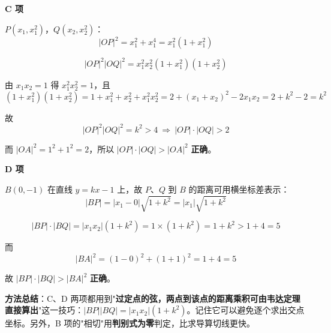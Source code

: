 \begin{answer}
\textbf{C 项 }

$P\left(x_1,x_1^{2}\right)$，$Q\left(x_2,x_2^{2}\right)$：
\nopagebreak[4]
\[|OP|^{2}=x_1^{2}+x_1^{4}=x_1^{2}\left(1+x_1^{2}\right)\]

\nopagebreak[4]
\[|OP|^{2}|OQ|^{2}=x_1^{2}x_2^{2}\left(1+x_1^{2}\right)\left(1+x_2^{2}\right)\]

由 $x_1x_2=1$ 得 $x_1^{2}x_2^{2}=1$，且
\nopagebreak[4]
\[\left(1+x_1^{2}\right)\left(1+x_2^{2}\right)=1+x_1^{2}+x_2^{2}+x_1^{2}x_2^{2}=2+\left(x_1+x_2\right)^{2}-2x_1x_2=2+k^{2}-2=k^{2}\]

故
\nopagebreak[4]
\[|OP|^{2}|OQ|^{2}=k^{2}>4\ \Longrightarrow\ |OP|\cdot|OQ|>2\]

而 $|OA|^{2}=1^{2}+1^{2}=2$，所以 $|OP|\cdot|OQ|>|OA|^{2}$  \textbf{正确}。

\par\medskip

\textbf{D 项 }

$B(0,-1)$ 在直线 $y=kx-1$ 上，故 $P$、$Q$ 到 $B$ 的距离可用横坐标差表示：
\nopagebreak[4]
\[|BP|=\left|x_1-0\right|\sqrt{1+k^{2}}=\left|x_1\right|\sqrt{1+k^{2}}\]

\nopagebreak[4]
\[|BP|\cdot|BQ|=\left|x_1x_2\right|\left(1+k^{2}\right)=1\times\left(1+k^{2}\right)=1+k^{2}>1+4=5\]

而
\nopagebreak[4]
\[|BA|^{2}=(1-0)^{2}+(1+1)^{2}=1+4=5\]

故 $|BP|\cdot|BQ|>|BA|^{2}$  \textbf{正确}。

\begin{gktip}
\textbf{方法总结}：C、D 两项都用到"\textbf{过定点的弦，两点到该点的距离乘积可由韦达定理直接算出}"这一技巧：$|BP||BQ|=\left|x_1x_2\right|\left(1+k^2\right)$。记住它可以避免逐个求出交点坐标。另外，B 项的"相切"用\textbf{判别式为零}判定，比求导算切线更快。
\end{gktip}


\par\medskip

\end{answer}
